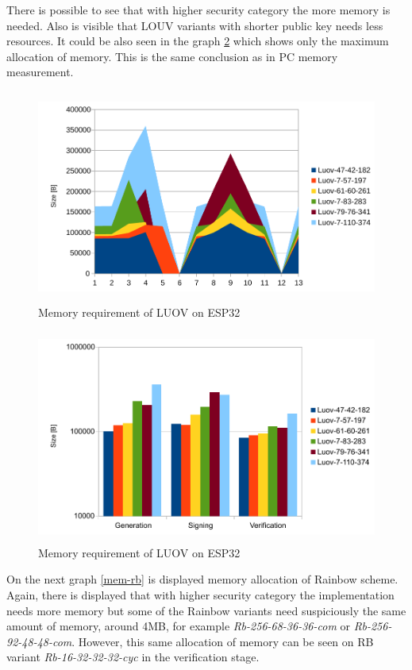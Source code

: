 \documentclass[thesis=M,english]{FITthesis}[2019/12/23]
\begin{document}
\bigskip
\noindent
There is possible to see that with higher security category the more memory is needed. Also is visible that LOUV variants with shorter public key needs less resources. It could be also seen in the graph \ref{mem-luov} which shows only the maximum allocation of memory. This is the same conclusion as in PC memory measurement. 

\newpage
\bigskip\bigskip
\begin{figure}[H]
\centering
\includegraphics[width=13cm,height=7cm]{images/mem-luov0.pdf}
\caption{Memory requirement of LUOV on ESP32}
\label{mem-luov0}
\end{figure}

\bigskip\bigskip\bigskip
\begin{figure}[H]
\centering
\includegraphics[width=13cm,height=7cm]{images/mem-luov.pdf}
\caption{Memory requirement of LUOV on ESP32}
\label{mem-luov}
\end{figure}

\newpage
\noindent
On the next graph \ref{mem-rb} is displayed memory allocation of Rainbow scheme. Again, there is displayed that with higher security category the implementation needs more memory but some of the Rainbow variants need suspiciously the same amount of memory, around 4MB, for example \textit{Rb-256-68-36-36-com} or \textit{Rb-256-92-48-48-com}. However, this same allocation of memory can be seen on RB variant \textit{Rb-16-32-32-32-cyc} in the verification stage. 
\end{document}
